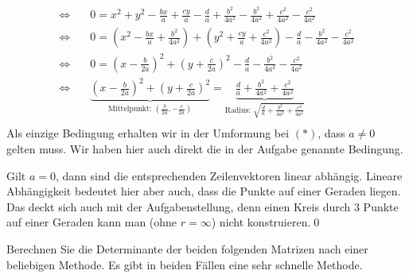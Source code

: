 \documentclass[answers]{exam}
\begin{document}
\begin{questions}
\begin{solution}
$$\begin{aligned}
                \iff \quad                         & 0   = x^2 + y^2 -\frac{bx}{a} + \frac{cy}{a} - \frac{d}{a} + \frac{b^2}{4a^2} - \frac{b^2}{4a^2} + \frac{c^2}{4a^2} - \frac{c^2}{4a^2}                                                                                                                                                                   \\
                \iff \quad                         & 0   = \left(x^2 -\frac{bx}{a} + \frac{b^2}{4a^2} \right) + \left( y^2  + \frac{cy}{a} + \frac{c^2}{4a^2} \right) - \frac{d}{a} - \frac{b^2}{4a^2}  - \frac{c^2}{4a^2}                                                                                                                                    \\
                \iff \quad                         & 0   = \left(x -\frac{b}{2a}\right)^2 + \left( y  + \frac{c}{2a} \right)^2 - \frac{d}{a} - \frac{b^2}{4a^2}  - \frac{c^2}{4a^2}                                                                                                                                                                           \\
                \iff \quad                         & \underbrace{\left(x -\frac{b}{2a}\right)^2 + \left( y  + \frac{c}{2a} \right)^2}_{\text{Mittelpunkt: } \left(\frac{b}{2a}, -\frac{c}{2a}\right)} = \underbrace{\frac{d}{a} + \frac{b^2}{4a^2}  + \frac{c^2}{4a^2}}_{\text{Radius: } \sqrt{\frac{d}{a} + \frac{b^2}{4a^2}  + \frac{c^2}{4a^2}}}           \\
            \end{aligned}
        $$
        Als einzige Bedingung erhalten wir in der Umformung bei $(*)$, dass $a \neq 0$ gelten muss.
        Wir haben hier auch direkt die in der Aufgabe genannte Bedingung.

        Gilt $a = 0$, dann sind die entsprechenden Zeilenvektoren linear abhängig. Lineare Abhängigkeit bedeutet hier aber auch, dass die Punkte auf einer Geraden liegen.
        Das deckt sich auch mit der Aufgabenstellung, denn einen Kreis durch 3 Punkte auf einer Geraden kann man (ohne $r = \infty$) nicht konstruieren.\qed
    \end{solution}

    \newpage
    \question
    Berechnen Sie die Determinante der beiden folgenden Matrizen nach einer beliebigen Methode.
    Es gibt in beiden Fällen eine sehr schnelle Methode.
    \begin{parts}

\end{parts}
\end{questions}
\end{document}
